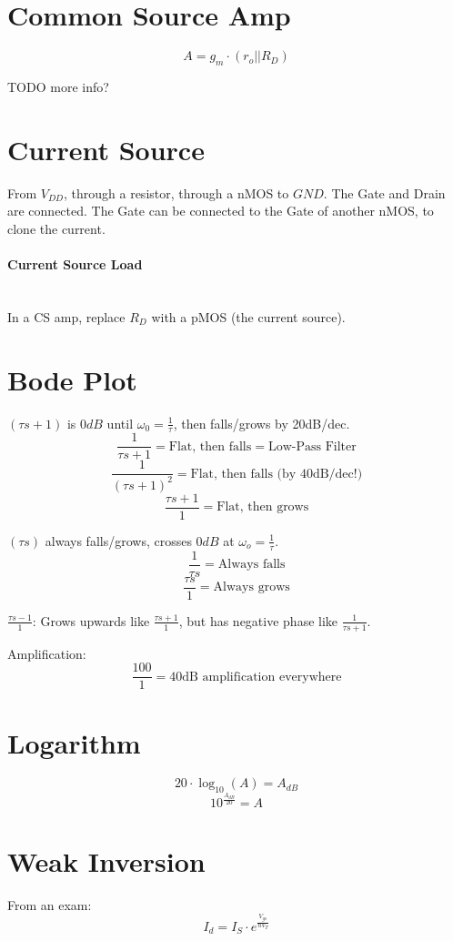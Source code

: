 \documentclass[twocolumn]{article}
\begin{document}
  \section{Common Source Amp}
    $$A = g_m \cdot (r_o || R_D)$$

    TODO more info?

  \section{Current Source}
    From $V_{DD}$, through a resistor, through a nMOS to $GND$.
    The Gate and Drain are connected.
    The Gate can be connected to the Gate of another nMOS, to clone the current.

    \paragraph{Current Source Load} \hfill \\
      In a CS amp, replace $R_D$ with a pMOS (the current source).

  \section{Bode Plot}
    $(\tau s + 1)$ is $0dB$ until $\omega_0 = \frac{1}{\tau}$, then falls/grows
    by 20dB/dec.
    $$\frac{1}{\tau s + 1} = \text{Flat, then falls} = \text{Low-Pass Filter}$$
    $$\frac{1}{(\tau s + 1)^2} = \text{Flat, then falls (by 40dB/dec!)}$$
    $$\frac{\tau s + 1}{1} = \text{Flat, then grows}$$

    $(\tau s)$ always falls/grows, crosses $0dB$ at $\omega_o = \frac{1}{\tau}$.
    $$\frac{1}{\tau s} = \text{Always falls}$$
    $$\frac{\tau s}{1} = \text{Always grows}$$

    $\frac{\tau s - 1}{1}$:
    Grows upwards like $\frac{\tau s + 1}{1}$, but has negative phase like
    $\frac{1}{\tau s + 1}$.

    Amplification:
    $$\frac{100}{1} = \text{40dB amplification everywhere}$$

  \section{Logarithm}
    $$20 \cdot \log_{10}(A) = A_{dB}$$
    $$10^{\frac{A_{dB}}{20}} = A$$

  \section{Weak Inversion}
    From an exam:
    $$I_d = I_S \cdot e^{\frac{V_{gs}}{n V_T}}$$
\end{document}
